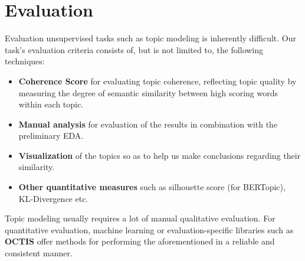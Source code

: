 \section{Evaluation}
\label{sec:evaluation}

Evaluation unsupervised tasks such as topic modeling is inherently difficult. Our task's evaluation criteria consists of, but is not limited to, the following techniques:

\begin{itemize}
    \item \textbf{Coherence Score} for evaluating topic coherence, reflecting topic quality by measuring the degree of semantic similarity between high scoring words within each topic.
    \item \textbf{Manual analysis} for evaluation of the results in combination with the preliminary EDA.
    \item \textbf{Visualization} of the topics so as to help us make conclusions regarding their similarity.
    \item \textbf{Other quantitative measures} such as silhouette score (for BERTopic), KL-Divergence etc. 
\end{itemize}

Topic modeling usually requires a lot of manual qualitative evaluation. For quantitative evaluation, machine learning or evaluation-specific libraries such as \textbf{OCTIS}\cite{octis} offer methods for performing the aforementioned in a reliable and consistent manner.




